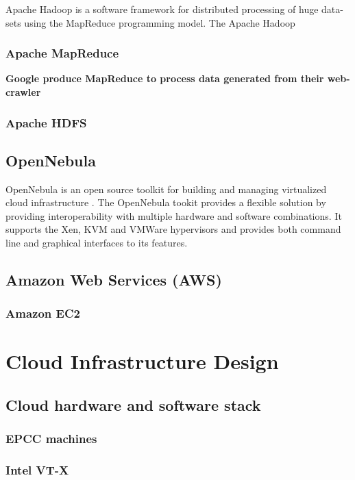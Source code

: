 \documentclass[12pt,a4paper]{report}
\begin{document}
Apache Hadoop is a software framework for distributed processing of huge data-sets
using the MapReduce programming model. The Apache Hadoop 

\subsection{Apache MapReduce}

{\bf Google produce MapReduce to process data generated from their web-crawler}

\subsection{Apache HDFS}

\section{OpenNebula}

OpenNebula is an open source toolkit for building and managing virtualized
cloud infrastructure \cite{website:one}. The OpenNebula tookit provides a flexible
solution by providing interoperability with multiple hardware and software combinations.
It supports the Xen, KVM and VMWare hypervisors and provides both command line
and graphical interfaces to its features.


\section{Amazon Web Services (AWS)}

\subsection{Amazon EC2}

\chapter{Cloud Infrastructure Design}

\section{Cloud hardware and software stack}
\subsection{EPCC machines}
\subsection{Intel VT-X}
\end{document}
